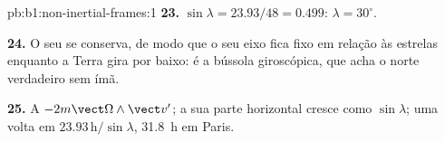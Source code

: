 \begin{solution}{pb:b1:non-inertial-frames:1}
\textbf{23.} $\sin\lambda = 23.93/48 = 0.499$: $\lambda = 30^\circ$.

\textbf{24.} O seu  se conserva, de modo que o seu eixo fica
fixo em relação às estrelas enquanto a Terra gira por baixo: é a bússola
giroscópica, que acha o norte verdadeiro sem ímã.

\textbf{25.} A  $-2m\vect\Omega\wedge\vect v'$; a sua parte
horizontal cresce como $\sin\lambda$; uma volta em $23.93\,\text{h}/\sin\lambda$,
\qty{31.8}{h} em Paris.
\end{solution}
